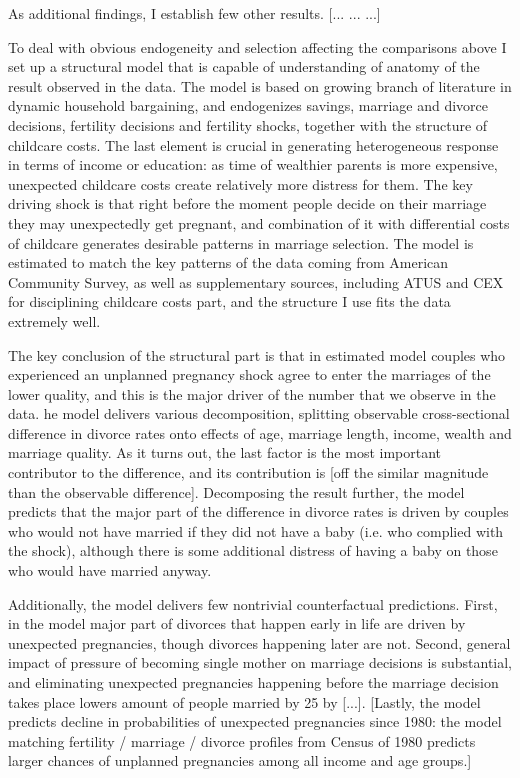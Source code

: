 \documentclass[12pt,letter]{article}
\begin{document}
As additional findings, I establish few other results. [... ... ...]

To deal with obvious endogeneity and selection affecting the comparisons above I set up a structural model that is capable of understanding of anatomy of the result observed in the data. The model is based on growing branch of literature in dynamic household bargaining, and endogenizes savings, marriage and divorce decisions, fertility decisions and fertility shocks, together with the structure of childcare costs. The last element is crucial in generating heterogeneous response in terms of income or education: as time of wealthier parents is more expensive, unexpected childcare costs create relatively more distress for them. The key driving shock is that right before the moment people decide on their marriage they may unexpectedly get pregnant, and combination of it with differential costs of childcare generates desirable patterns in marriage selection. The model is estimated to match the key patterns of the data coming from American Community Survey, as well as supplementary sources, including ATUS and CEX for disciplining childcare costs part, and the structure I use fits the data extremely well.

The key conclusion of the structural part is that in estimated model couples who experienced an unplanned pregnancy shock agree to enter the marriages of the lower quality, and this is the major driver of the number that we observe in the data. he model delivers various decomposition, splitting observable cross-sectional difference in divorce rates onto effects of age, marriage length, income, wealth and marriage quality. As it turns out, the last factor is the most important contributor to the difference, and its contribution is [off the similar magnitude than the observable difference]. Decomposing the result further, the model predicts that the major part of the difference in divorce rates is driven by couples who would not have married if they did not have a baby (i.e. who complied with the shock), although there is some additional distress of having a baby on those who would have married anyway.

Additionally, the model delivers few nontrivial counterfactual predictions. First, in the model major part of divorces that happen early in life are driven by unexpected pregnancies, though divorces happening later are not. Second, general impact of pressure of becoming single mother on marriage decisions is substantial, and eliminating unexpected pregnancies happening before the marriage decision takes place lowers amount of people married by 25 by [...]. [Lastly, the model predicts decline in probabilities of unexpected pregnancies since 1980: the model matching fertility / marriage / divorce profiles from Census of 1980 predicts larger chances of unplanned pregnancies among all income and age groups.]
\end{document}
